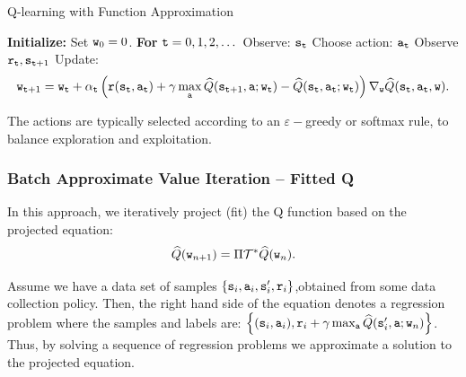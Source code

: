 \begin{algorithm}[H]
\caption{Q-learning with Function Approximation}\label{alg:Q-learning}
\begin{algorithmic}[1]
\State \textbf{Initialize:} Set ${\tt w}_0 = 0$.
\State \textbf{For} {${\tt t} = 0, 1, 2, \dots$}
    \State \quad Observe: ${\tt s}_{\tt t}$ 
    \State \quad Choose action: ${\tt a}_{\tt t}$ 
    \State \quad Observe ${\tt r}_{\tt t}, {\tt s}_{{\tt t}+1}$
    \State \quad Update:
    \begin{equation*}
    {\tt w}_{{\tt t}+1} = {\tt w}_{\tt t} + \alpha_{\tt t} \left( {\tt r}({\tt s}_{\tt t},{\tt a}_{\tt t}) + \gamma \max_{\tt a} \widehat{Q}({\tt s}_{{\tt t}+1},{\tt a};{\tt w}_{\tt t}) - \widehat{Q}({\tt s}_{{\tt t}},{\tt a}_{{\tt t}}; {\tt w}_{\tt t}) \right) \nabla_{{\tt w}} \widehat{Q}({\tt s}_{\tt t},{\tt a}_{\tt t},{\tt w}).
\end{equation*}
\end{algorithmic}
\end{algorithm}

The actions are typically selected according to an $\varepsilon-$greedy or softmax rule, to balance exploration and exploitation.

\subsubsection{Batch Approximate Value Iteration -- Fitted Q}

In this approach, we iteratively project (fit) the Q function based on the projected equation:
\begin{equation*}
    \widehat{Q}({\tt w}_{n+1}) = \Pi \mathcal{T}^* \widehat{Q}({\tt w}_{n}).
\end{equation*}

Assume we have a data set of samples $\{{\tt s}_i,{\tt a}_i,{\tt s}'_i,{\tt r}_i\}$,obtained from some data collection policy. Then, the right hand side of the equation denotes a regression problem where the samples and labels are: $\left\{({\tt s}_i,{\tt a}_i), {\tt r}_i + \gamma \max_{\tt a} \widehat{Q}({\tt s}'_i, {\tt a};{\tt w}_{n})\right\}$. Thus, by solving a sequence of regression problems we approximate a solution to the projected equation.

